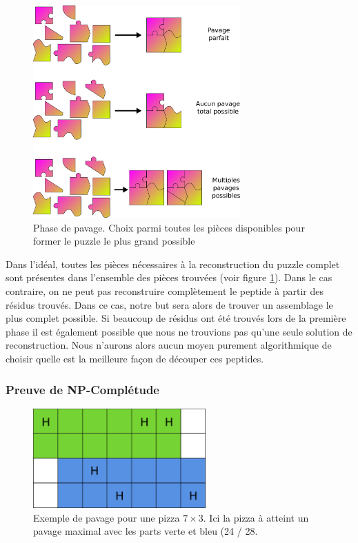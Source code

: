 \begin{figure}[!ht]
  \begin{center}
    \includegraphics[width=300px]{Figures/s2m/pavage/couvertures.png}
    \caption{\label{puzzle_covs}Phase de pavage.
    Choix parmi toutes les pièces disponibles pour former le puzzle le plus grand possible}
  \end{center}
\end{figure}

Dans l'idéal, toutes les pièces nécessaires à la reconstruction du puzzle complet sont présentes dans l'ensemble des pièces trouvées (voir figure \ref{puzzle_covs}).
Dans le cas contraire, on ne peut pas reconstruire complètement le peptide à partir des résidus trouvés.
Dans ce cas, notre but sera alors de trouver un assemblage le plus complet possible.
Si beaucoup de résidus ont été trouvés lors de la première phase il est également possible que nous ne trouvions pas qu'une seule solution de reconstruction.
Nous n'aurons alors aucun moyen purement algorithmique de choisir quelle est la meilleure façon de découper ces peptides.




\subsubsection{Preuve de NP-Complétude}

\begin{figure}[!ht]
  \begin{center}
    \includegraphics[width=250px]{Figures/s2m/pavage/pizza.png}
    \caption{\label{pizza}Exemple de pavage pour une pizza $7 \times 3$.
    Ici la pizza à atteint un pavage maximal avec les parts verte et bleu (24 / 28.}
  \end{center}
\end{figure}

